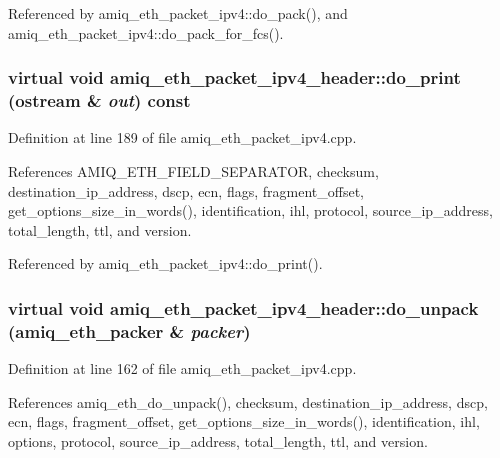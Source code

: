 Referenced by amiq\_\-eth\_\-packet\_\-ipv4::do\_\-pack(), and amiq\_\-eth\_\-packet\_\-ipv4::do\_\-pack\_\-for\_\-fcs().\hypertarget{classamiq__eth__packet__ipv4__header_ae3c2ee52b4d7ee6950e76559fd3fcabf}{
\subsubsection[{do\_\-print}]{\setlength{\rightskip}{0pt plus 5cm}virtual void amiq\_\-eth\_\-packet\_\-ipv4\_\-header::do\_\-print (ostream \& {\em out}) const}}
\label{classamiq__eth__packet__ipv4__header_ae3c2ee52b4d7ee6950e76559fd3fcabf}


Definition at line 189 of file amiq\_\-eth\_\-packet\_\-ipv4.cpp.

References AMIQ\_\-ETH\_\-FIELD\_\-SEPARATOR, checksum, destination\_\-ip\_\-address, dscp, ecn, flags, fragment\_\-offset, get\_\-options\_\-size\_\-in\_\-words(), identification, ihl, protocol, source\_\-ip\_\-address, total\_\-length, ttl, and version.

Referenced by amiq\_\-eth\_\-packet\_\-ipv4::do\_\-print().\hypertarget{classamiq__eth__packet__ipv4__header_a4852822c4486879107ba944d7d649e68}{
\subsubsection[{do\_\-unpack}]{\setlength{\rightskip}{0pt plus 5cm}virtual void amiq\_\-eth\_\-packet\_\-ipv4\_\-header::do\_\-unpack ({\bf amiq\_\-eth\_\-packer} \& {\em packer})}}
\label{classamiq__eth__packet__ipv4__header_a4852822c4486879107ba944d7d649e68}


Definition at line 162 of file amiq\_\-eth\_\-packet\_\-ipv4.cpp.

References amiq\_\-eth\_\-do\_\-unpack(), checksum, destination\_\-ip\_\-address, dscp, ecn, flags, fragment\_\-offset, get\_\-options\_\-size\_\-in\_\-words(), identification, ihl, options, protocol, source\_\-ip\_\-address, total\_\-length, ttl, and version.

